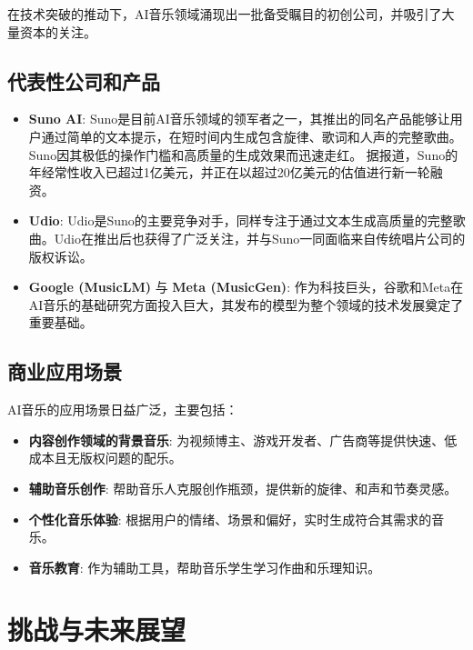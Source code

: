 \documentclass[12pt]{article}
\begin{document}
在技术突破的推动下，AI音乐领域涌现出一批备受瞩目的初创公司，并吸引了大量资本的关注。

\subsection{代表性公司和产品}
\begin{itemize}
    \item \textbf{Suno AI}: Suno是目前AI音乐领域的领军者之一，其推出的同名产品能够让用户通过简单的文本提示，在短时间内生成包含旋律、歌词和人声的完整歌曲。 Suno因其极低的操作门槛和高质量的生成效果而迅速走红。 据报道，Suno的年经常性收入已超过1亿美元，并正在以超过20亿美元的估值进行新一轮融资。
    \item \textbf{Udio}: Udio是Suno的主要竞争对手，同样专注于通过文本生成高质量的完整歌曲。Udio在推出后也获得了广泛关注，并与Suno一同面临来自传统唱片公司的版权诉讼。
    \item \textbf{Google (MusicLM)} 与 \textbf{Meta (MusicGen)}: 作为科技巨头，谷歌和Meta在AI音乐的基础研究方面投入巨大，其发布的模型为整个领域的技术发展奠定了重要基础。
\end{itemize}

\subsection{商业应用场景}
AI音乐的应用场景日益广泛，主要包括：
\begin{itemize}
    \item \textbf{内容创作领域的背景音乐}: 为视频博主、游戏开发者、广告商等提供快速、低成本且无版权问题的配乐。
    \item \textbf{辅助音乐创作}: 帮助音乐人克服创作瓶颈，提供新的旋律、和声和节奏灵感。
    \item \textbf{个性化音乐体验}: 根据用户的情绪、场景和偏好，实时生成符合其需求的音乐。
    \item \textbf{音乐教育}: 作为辅助工具，帮助音乐学生学习作曲和乐理知识。
\end{itemize}

\section{挑战与未来展望}
\end{document}
